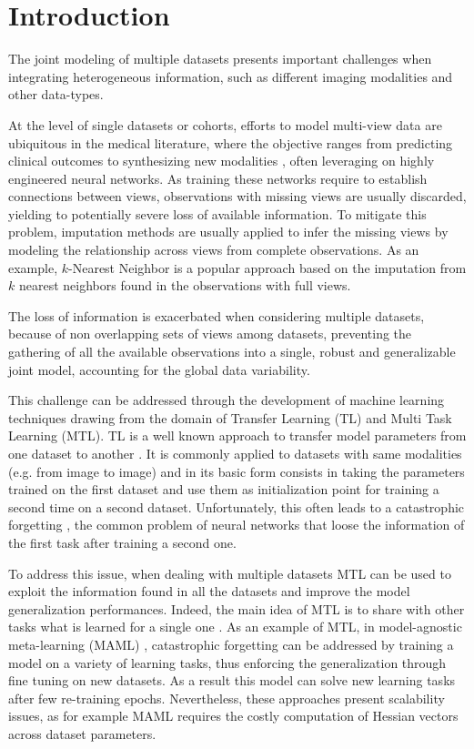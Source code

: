 \section{Introduction}

The joint modeling of multiple datasets presents important challenges when integrating heterogeneous information, such as different imaging modalities and other data-types.

At the level of single datasets or cohorts, efforts to model multi-view data are ubiquitous in the medical literature, where the objective ranges from predicting clinical outcomes \citep{Chen2019} to synthesizing new modalities \citep{Zhou2020, Wei2019}, often leveraging on highly engineered neural networks.
As training these networks require to establish connections between views, observations with missing views are usually discarded, yielding to potentially  severe loss of available information.
To mitigate this problem, imputation methods are usually applied to infer the missing views by modeling the relationship across views from complete observations.
As an example, $k$-Nearest Neighbor is a popular approach based on the imputation from $k$ nearest neighbors found in the observations with full views.

The loss of information is exacerbated when considering multiple datasets, because of non overlapping sets of views among datasets, preventing the gathering of all the available observations into a single, robust and generalizable joint model, accounting for the global data variability.

This challenge can be addressed through the development of machine learning techniques drawing from the domain of Transfer Learning (TL) and Multi Task Learning (MTL).
TL is a well known approach to transfer model parameters from one dataset to another \citep{TL}.
It is commonly applied to datasets with same modalities (e.g. from image to image) and in its basic form consists in taking the parameters trained on the first dataset and use them as initialization point for training a second time on a second dataset.
Unfortunately, this often leads to a catastrophic forgetting \citep{CatastroficForgetting}, the common problem of neural networks that loose the information of the first task after training a second one.

To address this issue, when dealing with multiple datasets MTL can be used to exploit the information found in all the datasets and improve the model generalization performances.
Indeed, the main idea of MTL is to share with other tasks what is learned for a single one \citep{Caruana1998, Dorado-Moreno2020}.
As an example of MTL, in model-agnostic meta-learning (MAML) \citep{MAML1}, catastrophic forgetting can be addressed by training a model on a variety of learning tasks, thus enforcing the generalization through fine tuning on new datasets.
As a result this model can solve new learning tasks after few re-training epochs.
Nevertheless, these approaches present scalability issues, as for example MAML requires the costly computation of Hessian vectors across dataset parameters.

